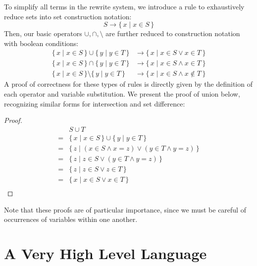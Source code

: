 \documentclass{article}
\newcommand{\Set}[2]{%
  \{\, #1 \mid #2 \, \}%
}
\begin{document}
To simplify all terms in the rewrite system, we introduce a rule to exhaustively reduce sets into set construction notation:
\begin{equation}
S \rightarrow \Set{x}{x \in S}
\end{equation}
Then, our basic operators $\cup, \cap, \setminus$ are further reduced to construction notation with boolean conditions:
\begin{align}
  \Set{x}{x \in S} \cup \Set{y}{y \in T} &\rightarrow \Set{x}{x \in S \lor x \in T}\\
  \Set{x}{x \in S} \cap \Set{y}{y \in T} &\rightarrow \Set{x}{x \in S \land x \in T}\\
  \Set{x}{x \in S} \setminus \Set{y}{y \in T} &\rightarrow \Set{x}{x \in S \land x \notin T}
\end{align}
A proof of correctness for these types of rules is directly given by the definition of each operator and variable substitution. We present the proof of union below, recognizing similar forms for intersection and set difference:
\begin{proof}
  \begin{align*}
    &S \cup T\\
    =&\Set{x}{x \in S} \cup \Set{y}{y \in T}\\
    =&\Set{z}{(x \in S \land x = z) \lor (y \in T \land y = z)}\\
    =&\Set{z}{z \in S \lor (y \in T \land y = z)}\\
    =&\Set{z}{z \in S \lor z \in T}\\
    =&\Set{x}{x \in S \lor x \in T}\\
  \end{align*}
\end{proof}
Note that these proofs are of particular importance, since we must be careful of occurrences of variables within one another.





\section{A Very High Level Language}
\end{document}
